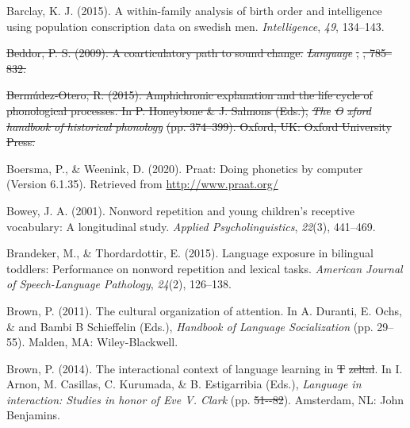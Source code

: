 \documentclass[english,,man,floatsintext]{apa6} %
\providecommand{\DIFaddtex}[1]{{\protect\color{blue}\uwave{#1}}} %
\providecommand{\DIFdeltex}[1]{{\protect\color{red}\sout{#1}}}                      %
\providecommand{\DIFaddbegin}{} %
\providecommand{\DIFaddend}{} %
\providecommand{\DIFdelbegin}{} %
\providecommand{\DIFdelend}{} %
\providecommand{\DIFadd}[1]{\texorpdfstring{\DIFaddtex{#1}}{#1}} %
\providecommand{\DIFdel}[1]{\texorpdfstring{\DIFdeltex{#1}}{}} %
\newcommand{\DIFscaledelfig}{0.5}
\newlength{\DIFdelgraphicswidth} %
\newlength{\DIFdelgraphicsheight} %
\newcommand{\DIFaddincludegraphics}[2][]{{\color{blue}\fbox{\DIFOincludegraphics[#1]{#2}}}} %
\newcommand{\DIFdelincludegraphics}[2][]{%
	\sbox{\DIFdelgraphicsbox}{\DIFOincludegraphics[#1]{#2}}%
	\settoboxwidth{\DIFdelgraphicswidth}{\DIFdelgraphicsbox} %
	\settoboxtotalheight{\DIFdelgraphicsheight}{\DIFdelgraphicsbox} %
	\scalebox{\DIFscaledelfig}{%
		\parbox[b]{\DIFdelgraphicswidth}{\usebox{\DIFdelgraphicsbox}\\[-\baselineskip] \rule{\DIFdelgraphicswidth}{0em}}\llap{\resizebox{\DIFdelgraphicswidth}{\DIFdelgraphicsheight}{%
				\setlength{\unitlength}{\DIFdelgraphicswidth}%
				\begin{picture}(1,1)%
				\thicklines\linethickness{2pt} %
				{\color[rgb]{1,0,0}\put(0,0){\framebox(1,1){}}}%
				{\color[rgb]{1,0,0}\put(0,0){\line( 1,1){1}}}%
				{\color[rgb]{1,0,0}\put(0,1){\line(1,-1){1}}}%
				\end{picture}%
			}\hspace*{3pt}}} %
} %
\DeclareRobustCommand{\DIFaddbegin}{\DIFOaddbegin \let\includegraphics\DIFaddincludegraphics} %
\DeclareRobustCommand{\DIFaddend}{\DIFOaddend \let\includegraphics\DIFOincludegraphics} %
\DeclareRobustCommand{\DIFdelbegin}{\DIFOdelbegin \let\includegraphics\DIFdelincludegraphics} %
\DeclareRobustCommand{\DIFdelend}{\DIFOaddend \let\includegraphics\DIFOincludegraphics} %
\begin{document}
\leavevmode\hypertarget{ref-barclay2015within}{}%
Barclay, K. J. (2015). A within-family analysis of birth order and intelligence using population conscription data on swedish men. \emph{Intelligence}, \emph{49}, 134--143.

\leavevmode\DIFdelbegin %
\DIFdel{Beddor, P. S. (2009). A coarticulatory path to sound change. }\emph{\DIFdel{Language}}%
\DIFdel{, }%
\DIFdel{, 785--832.
}%

\DIFdel{Bermúdez-Otero, R. (2015). Amphichronic explanation and the life cycle of phonological processes. In P. Honeybone \& J. Salmons (Eds.), }\emph{\DIFdel{The }%
	\DIFdel{O}%
	\DIFdel{xford handbook of historical phonology}} %
\DIFdel{(pp. 374--399). Oxford, UK: Oxford University Press.
}%

\DIFdelend \hypertarget{ref-Praat}{}%
Boersma, P., \& Weenink, D. (2020). Praat: Doing phonetics by computer (Version 6.1.35). Retrieved from \url{http://www.praat.org/}

\leavevmode\hypertarget{ref-bowey2001nonword}{}%
Bowey, J. A. (2001). Nonword repetition and young children's receptive vocabulary: A longitudinal study. \emph{Applied Psycholinguistics}, \emph{22}(3), 441--469.

\leavevmode\hypertarget{ref-brandeker2015language}{}%
Brandeker, M., \& Thordardottir, E. (2015). Language exposure in bilingual toddlers: Performance on nonword repetition and lexical tasks. \emph{American Journal of Speech-Language Pathology}, \emph{24}(2), 126--138.

\leavevmode\hypertarget{ref-brown2011cultural}{}%
Brown, P. (2011). The cultural organization of attention. In A. Duranti, E. Ochs, \& and Bambi B Schieffelin (Eds.), \emph{Handbook of \DIFdelbegin %
	\DIFdelend Language Socialization\DIFdelbegin %
	\DIFdelend } (pp. 29--55). Malden, MA: Wiley-Blackwell.

\leavevmode\hypertarget{ref-brown2014interactional}{}%
Brown, P. (2014). The interactional context of language learning in \DIFdelbegin %
\DIFdel{T}%
\DIFdel{zeltal}\DIFdelend \DIFaddbegin \DIFadd{Tzeltal}\DIFaddend . In I. Arnon, M. Casillas, C. Kurumada, \& B. Estigarribia (Eds.), \emph{Language in interaction: Studies in honor of \DIFdelbegin %
	\DIFdelend Eve V. Clark\DIFdelbegin %
	\DIFdelend } (pp. \DIFdelbegin \DIFdel{51-\/-82}\DIFdelend \DIFaddbegin \DIFadd{51--82}\DIFaddend ). Amsterdam, NL: John Benjamins.
\end{document}
